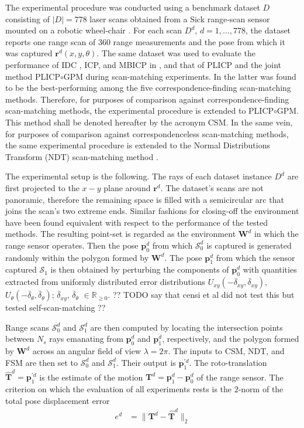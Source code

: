 The experimental procedure was conducted using a benchmark dataset $D$
consisting of $|D| = 778$ laser scans obtained from a Sick range-scan sensor
mounted on a robotic wheel-chair \cite{dataset_link}. For
each scan $D^d$, $d = 1,\dots,778$, the dataset reports one range scan of $360$
range measurements and the pose from which it was captured
$\bm{r}^d(x,y,\theta)$.  The same dataset was used to evaluate the performance
of IDC \cite{LuMilios}, ICP, and MBICP in \cite{mbicp}, and that of PLICP and
the joint method PLICP$\circ$GPM during scan-matching experiments. In
\cite{plicp} the latter was found to be the best-performing among the five
correspondence-finding scan-matching methods. Therefore, for purposes of
comparison against correspondence-finding scan-matching methods, the
experimental procedure is extended to PLICP$\circ$GPM. This method shall be
denoted hereafter by the acronym CSM. In the same vein, for purposes of
comparison against correspondenceless scan-matching methods, the same
experimental procedure is extended to the Normal Distributions Transform (NDT)
scan-matching method \cite{ndt1}.

The experimental setup is the following. The rays of each dataset instance
$D^d$ are first projected to the $x-y$ plane around $\bm{r}^d$. The dataset's
scans are not panoramic, therefore the remaining space is filled with a
semicircular arc that joins the scan's two extreme ends. Similar fashions for
closing-off the environment have been found equivalent with respect to the
performance of the tested methods. The resulting point-set is regarded as the
environment $\bm{W}^d$ in which the range sensor operates.  Then the pose
$\bm{p}_0^d$ from which $\mathcal{S}_0^d$ is captured is generated randomly
within the polygon formed by $\bm{W}^d$. The pose $\bm{p}_1^d$ from which the
sensor captured $\mathcal{S}_1$ is then obtained by perturbing the components
of $\bm{p}_0^d$ with quantities extracted from uniformly distributed error
distributions $U_{xy}(-\overline{\delta}_{xy}, \overline{\delta}_{xy})$,
$U_{\theta}(-\overline{\delta}_{\theta}, \overline{\delta}_{\theta})$;
$\overline{\delta}_{xy}$, $\overline{\delta}_\theta$ $\in \mathbb{R}_{\geq 0}$.
?? TODO say that censi et al did not test this but tested self-scan-matching ??


Range scans $\mathcal{S}_0^d$ and $\mathcal{S}_1^d$ are then computed by
locating the intersection points between $N_s$ rays emanating from $\bm{p}_0^d$
and $\bm{p}_1^d$, respectively, and the polygon formed by $\bm{W}^d$ across an
angular field of view $\lambda = 2\pi$. The inputs to CSM, NDT, and FSM are
then set to $\mathcal{S}_0^d$ and $\mathcal{S}_1^d$. Their output is
$\bm{p}_1^{\prime d}$. The roto-translation
$\hat{\bm{T}}^d = \bm{p}_1^{\prime d}$ is the estimate of the motion
$\bm{T}^d = \bm{p}_1^d - \bm{p}_0^d$ of the range sensor. The criterion on
which the evaluation of all experiments rests is the $2$-norm of the total pose
displacement error
\begin{align}
  e^d &= \| \bm{T}^d - \hat{\bm{T}}^d \|_2
  \label{eq:rototranslation_error}
\end{align}

